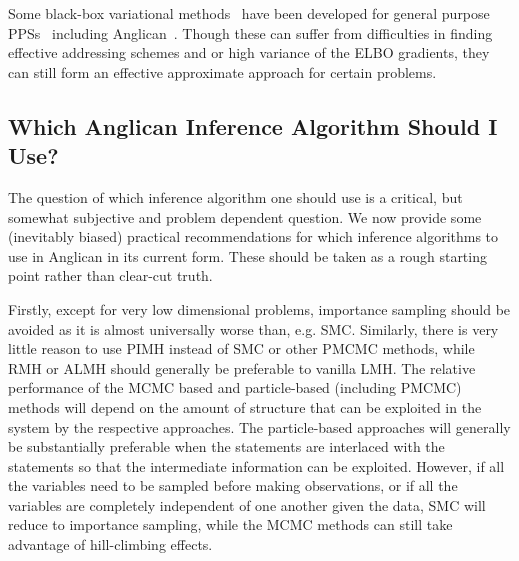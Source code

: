 Some black-box variational methods~\citep{ranganath_aistats_2014} 
	have been developed for general purpose PPSs~\citep{kucukelbir2015automatic} including Anglican~\citep{vandemeent2016black,paige2017thesis}.  Though these can suffer from difficulties
	in finding effective addressing schemes and or high variance of the ELBO gradients, they can still
	form an effective approximate approach for certain problems.

\subsection{Which Anglican Inference Algorithm Should I Use?}
\label{sec:proginf:str:which}

The question of which inference algorithm one should use is a critical, but somewhat subjective and
problem dependent question.  We now provide some (inevitably biased) practical recommendations for which
inference algorithms to use in Anglican in its current form.  These
should be taken as a rough starting point rather than clear-cut truth.

Firstly, except for very low dimensional problems, importance sampling should
be avoided as it is almost universally worse than, e.g. SMC.  Similarly, there is very little reason to use PIMH
instead of SMC or other PMCMC methods, while RMH or ALMH should generally be preferable to vanilla LMH.
The relative performance of the MCMC
based and particle-based (including PMCMC) methods will depend on the amount of structure that can
be exploited in the system by the respective approaches.  The particle-based approaches will generally be substantially
preferable when the \observe statements are interlaced with the \sample statements so that the intermediate
information can be exploited.  However, if all the variables need to be sampled before making observations, or if
all the variables are completely independent of one another given the data, SMC will reduce to importance sampling,
while the MCMC methods can still take advantage of hill-climbing effects.

